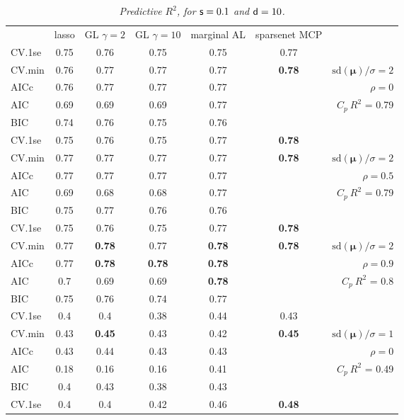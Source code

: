 \documentclass[12pt]{article}
\newcommand{\mr}[1]{\mathrm{#1}}
\newcommand{\bm}[1]{\mathbf{#1}}
\begin{document}
\begin{table}[p]\vspace{-.5cm}
\caption[l]{\label{r2}\it Predictive $R^2$, for ${\sf s}=0.1$ and  ${\sf d}=10$.}
\vspace{-.5cm}
\small{}
\begin{center}
\begin{tabular}{l*{5}{c}|r}
 & lasso & GL $\gamma=2$ & GL $\gamma=10$ & marginal AL & sparsenet MCP  &  \\
\cline{1-7}
CV.1se & 0.75 & 0.76 & 0.75 & 0.75 & 0.77 &\\
CV.min & 0.76 & 0.77 & 0.77 & 0.77 & {\bf 0.78} &  $\mr{sd}(\bm{\mu})/\sigma=2$ \\
AICc & 0.76 & 0.77 & 0.77 & 0.77 & & $\rho=0$ \\
AIC & 0.69 & 0.69 & 0.69 & 0.77 & & \multirow{2}{*}{$C_p ~ R^2$ = 0.79} \\
BIC & 0.74 & 0.76 & 0.75 & 0.76 & & \\
 \hline 
CV.1se & 0.75 & 0.76 & 0.75 & 0.77 & {\bf 0.78} &\\
CV.min & 0.77 & 0.77 & 0.77 & 0.77 & {\bf 0.78} &  $\mr{sd}(\bm{\mu})/\sigma=2$ \\
AICc & 0.77 & 0.77 & 0.77 & 0.77 & & $\rho=0.5$ \\
AIC & 0.69 & 0.68 & 0.68 & 0.77 & & \multirow{2}{*}{$C_p ~ R^2$ = 0.79} \\
BIC & 0.75 & 0.77 & 0.76 & 0.76 & & \\
 \hline 
CV.1se & 0.75 & 0.76 & 0.75 & 0.77 & {\bf 0.78} &\\
CV.min & 0.77 & {\bf 0.78} & 0.77 & {\bf 0.78} & {\bf 0.78} &  $\mr{sd}(\bm{\mu})/\sigma=2$ \\
AICc & 0.77 & {\bf 0.78} & {\bf 0.78} & {\bf 0.78} & & $\rho=0.9$ \\
AIC & 0.7 & 0.69 & 0.69 & {\bf 0.78} & & \multirow{2}{*}{$C_p ~ R^2$ = 0.8} \\
BIC & 0.75 & 0.76 & 0.74 & 0.77 & & \\
 \hline 
CV.1se & 0.4 & 0.4 & 0.38 & 0.44 & 0.43 &\\
CV.min & 0.43 & {\bf 0.45} & 0.43 & 0.42 & {\bf 0.45} &  $\mr{sd}(\bm{\mu})/\sigma=1$ \\
AICc & 0.43 & 0.44 & 0.43 & 0.43 & & $\rho=0$ \\
AIC & 0.18 & 0.16 & 0.16 & 0.41 & & \multirow{2}{*}{$C_p ~ R^2$ = 0.49} \\
BIC & 0.4 & 0.43 & 0.38 & 0.43 & & \\
 \hline 
CV.1se & 0.4 & 0.4 & 0.42 & 0.46 & {\bf 0.48} &\\

\end{tabular}
\end{center}
\end{table}
\end{document}
